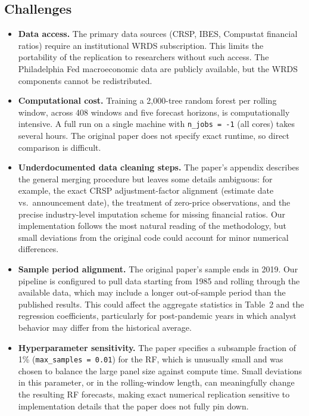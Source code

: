 \documentclass[12pt]{article}
\begin{document}
\subsection{Challenges}

\begin{itemize}

  \item \textbf{Data access.}  The primary data sources (CRSP, IBES,
  Compustat financial ratios) require an institutional WRDS subscription.
  This limits the portability of the replication to researchers without
  such access.  The Philadelphia Fed macroeconomic data are publicly
  available, but the WRDS components cannot be redistributed.

  \item \textbf{Computational cost.}  Training a 2{,}000-tree random forest
  per rolling window, across 408 windows and five forecast horizons, is
  computationally intensive.  A full run on a single machine with
  \texttt{n\_jobs = -1} (all cores) takes several hours.  The original
  paper does not specify exact runtime, so direct comparison is difficult.

  \item \textbf{Underdocumented data cleaning steps.}  The paper's appendix
  describes the general merging procedure but leaves some details ambiguous:
  for example, the exact CRSP adjustment-factor alignment (estimate date
  vs.\ announcement date), the treatment of zero-price observations, and the
  precise industry-level imputation scheme for missing financial ratios.
  Our implementation follows the most natural reading of the methodology,
  but small deviations from the original code could account for minor
  numerical differences.

  \item \textbf{Sample period alignment.}  The original paper's sample ends
  in 2019.  Our pipeline is configured to pull data starting from 1985 and
  rolling through the available data, which may include a longer out-of-sample
  period than the published results.  This could affect the aggregate
  statistics in Table~2 and the regression coefficients, particularly for
  post-pandemic years in which analyst behavior may differ from the historical
  average.

  \item \textbf{Hyperparameter sensitivity.}  The paper specifies a
  subsample fraction of 1\% (\texttt{max\_samples = 0.01}) for the RF,
  which is unusually small and was chosen to balance the large panel size
  against compute time.  Small deviations in this parameter, or in the
  rolling-window length, can meaningfully change the resulting RF forecasts,
  making exact numerical replication sensitive to implementation details
  that the paper does not fully pin down.

\end{itemize}

\newpage


\end{document}
